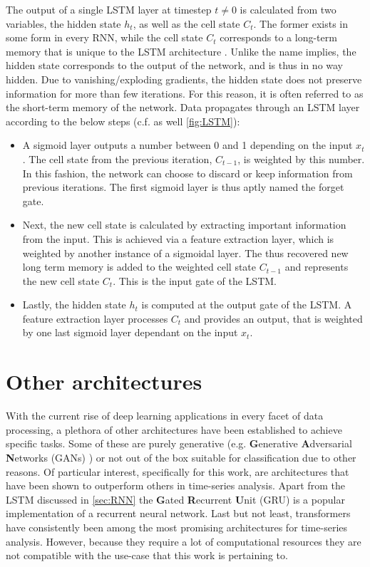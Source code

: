 The output of a single LSTM layer at timestep $t\neq0$ is calculated from two variables, the hidden state $h_t$, as well as the cell state $C_t$. The former exists in 
some form in every RNN, while the cell state $C_t$ corresponds to a long-term memory that is unique to the LSTM architecture \cite{gers2000learning}. Unlike the name 
implies, the hidden state corresponds to the output of the network, and is thus in no way hidden. Due to vanishing/exploding gradients, the hidden state does not 
preserve information for more than few iterations. For this reason, it is often referred to as the short-term memory of the network. Data propagates through an LSTM 
layer according to the below steps (c.f. as well \autoref{fig:LSTM}):

\begin{itemize}
	\item A sigmoid layer outputs a number between 0 and 1 depending on the input $x_t$. The cell state from the previous iteration, $C_{t-1}$, is weighted by this 
	number. In this fashion, the network can choose to discard or keep information from previous iterations. The first sigmoid layer is thus aptly named the 
	forget gate.
	\item Next, the new cell state is calculated by extracting important information from the input. This is achieved via a feature extraction layer, which is 
	weighted by another instance of a sigmoidal layer. The thus recovered new long term memory is added to the weighted cell state $C_{t-1}$ and represents the new 
	cell state $C_t$. This is the input gate of the LSTM.
	\item Lastly, the hidden state $h_t$ is computed at the output gate of the LSTM. A feature extraction layer processes $C_t$ and provides an output, that is 
	weighted by one last sigmoid layer dependant on the input $x_t$.
\end{itemize}

\section{Other architectures}
\label{sec:NN-other}

With the current rise of deep learning applications in every facet of data processing, a plethora of other architectures have been established to achieve specific
tasks. Some of these are purely generative (e.g. \textbf{G}enerative \textbf{A}dversarial \textbf{N}etworks (GANs) \cite{creswell2018generative}) or not out of the 
box suitable for classification due to other reasons. Of particular interest, specifically for this work, are architectures that have been shown to outperform others
in time-series analysis. Apart from the LSTM discussed in \autoref{sec:RNN} the \textbf{G}ated \textbf{R}ecurrent \textbf{U}nit (GRU) \cite{dey2017gate} is a popular 
implementation of a recurrent neural network. Last but not least, transformers \cite{vaswani2017attention} have consistently been among the most promising architectures 
for time-series analysis. However, because they require a lot of computational resources they are not compatible with the use-case that this work is pertaining to.